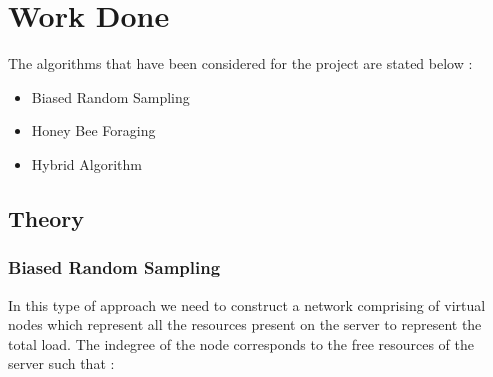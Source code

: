 \vspace{-2in}
\chapter{Work Done}
The algorithms that have been considered for the project are stated below :
\begin{itemize}
\item Biased Random Sampling
\item Honey Bee Foraging
\item Hybrid Algorithm
\end{itemize}

\section{Theory}
\subsection{Biased Random Sampling}
In this type of approach we need to construct a network comprising of virtual nodes 
which represent all the resources present on the server to represent the total load.
The indegree of the node corresponds to the free resources of the server such that \cite{Madhu}:


